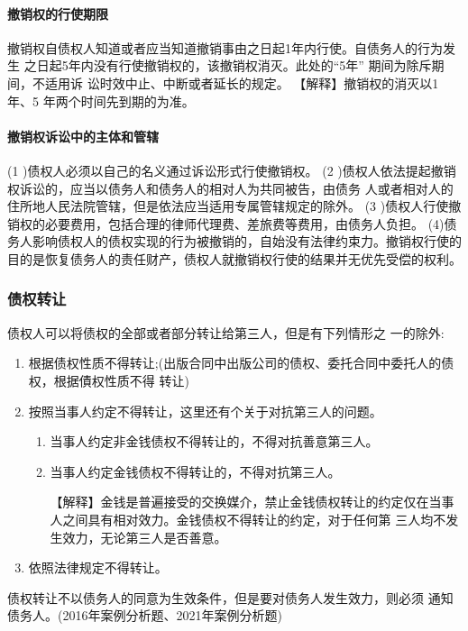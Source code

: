 \documentclass[UTF8,12pt]{ctexart}
\numberwithin{equation}{section} %
\numberwithin{figure}{section}
\numberwithin{table}{section}
\begin{document}
	\paragraph{撤销权的行使期限}撤销权自债权人知道或者应当知道撤销事由之日起1年内行使。自债务人的行为发生 之日起5年内没有行使撤销权的，该撤销权消灭。此处的“5年” 期间为除斥期间，不适用诉 讼时效中止、中断或者延长的规定。
	【解释】撤销权的消灭以1 年、5 年两个时间先到期的为准。
	
	\paragraph{撤销权诉讼中的主体和管辖}
	(1 )债权人必须以自己的名义通过诉讼形式行使撤销权。
	(2 )债权人依法提起撤销权诉讼的，应当以债务人和债务人的相对人为共同被告，由债务 人或者相对人的住所地人民法院管辖，但是依法应当适用专属管辖规定的除外。
	(3 )债权人行使撤销权的必要费用，包括合理的律师代理费、差旅费等费用，由债务人负担。 (4)债务人影响债权人的债权实现的行为被撤销的，自始没有法律约束力。撤销权行使的 目的是恢复债务人的责任财产，债权人就撤销权行使的结果并无优先受偿的权利。
	
	
	\subsubsection{债权转让}
	债权人可以将债权的全部或者部分转让给第三人，但是有下列情形之 一的除外: 
	\begin{enumerate}
		\item 根据债权性质不得转让;(出版合同中出版公司的债权、委托合同中委托人的债权，根据債权性质不得 转让)
		
		\item 按照当事人约定不得转让，这里还有个关于对抗第三人的问题。
		\begin{enumerate}
			\item 当事人约定非金钱债权不得转让的，不得对抗善意第三人。
			
			\item 当事人约定金钱债权不得转让的，不得对抗第三人。 
			
			【解释】金钱是普遍接受的交换媒介，禁止金钱债权转让的约定仅在当事人之间具有相对效力。金钱债权不得转让的约定，对于任何第 三人均不发生效力，无论第三人是否善意。
		\end{enumerate}
		
		\item 依照法律规定不得转让。
	\end{enumerate}
	
	债权转让不以债务人的同意为生效条件，但是要对债务人发生效力，则必须 通知债务人。(2016年案例分析题、2021年案例分析题) 
	
\end{document}
